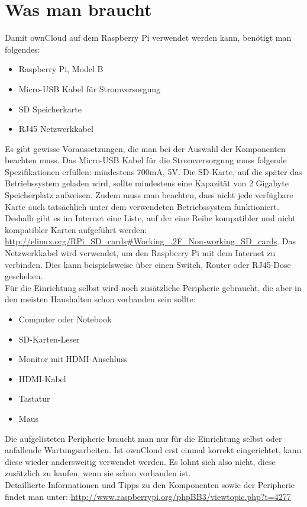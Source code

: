 \section{Was man braucht}
Damit ownCloud auf dem Raspberry Pi verwendet werden kann, benötigt man folgendes:

\begin{itemize}
  \item Raspberry Pi, Model B
  \item Micro-USB Kabel für Stromversorgung
  \item SD Speicherkarte
  \item RJ45 Netzwerkkabel
\end{itemize}

Es gibt gewisse Voraussetzungen, die man bei der Auswahl der Komponenten beachten muss. Das Micro-USB Kabel für die Stromversorgung muss folgende Spezifikationen erfüllen: mindestens 700mA, 5V. Die SD-Karte, auf die später das Betriebssystem geladen wird, sollte mindestens eine Kapazität von 2 Gigabyte Speicherplatz aufweisen. Zudem muss man beachten, dass nicht jede verfügbare Karte auch tatsächlich unter dem verwendeten Betriebssystem funktioniert. Deshalb gibt es im Internet eine Liste, auf der eine Reihe kompatibler und nicht kompatibler Karten aufgeführt werden: \url{http://elinux.org/RPi\_SD\_cards\#Working\_.2F\_Non-working\_SD\_cards}. 
Das Netzwerkkabel wird verwendet, um den Raspberry Pi mit dem Internet zu verbinden. Dies kann beispielsweise über einen Switch, Router oder RJ45-Dose geschehen.
\\
Für die Einrichtung selbst wird noch zusätzliche Peripherie gebraucht, die aber in den meisten Haushalten schon vorhanden sein sollte: 

\begin{itemize}
  \item Computer oder Notebook
  \item SD-Karten-Leser
  \item Monitor mit HDMI-Anschluss
  \item HDMI-Kabel
  \item Tastatur
  \item Maus
\end{itemize}

Die aufgelisteten Peripherie braucht man nur für die Einrichtung selbst oder anfallende Wartungsarbeiten.
Ist ownCloud erst einmal korrekt eingerichtet, kann diese wieder andersweitig verwendet werden. Es lohnt sich also nicht, diese zusätzlich zu kaufen, wenn sie schon vorhanden ist. 
\\
Detaillierte Informationen und Tipps zu den Komponenten sowie der Peripherie findet man unter: \url{http://www.raspberrypi.org/phpBB3/viewtopic.php?t=4277}

